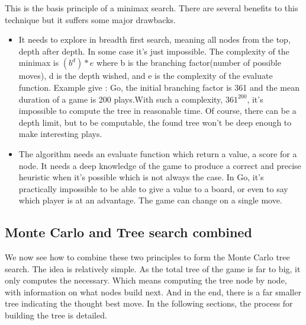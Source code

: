 	
 This is the basis principle of a minimax search. There are several benefits to this technique but it suffers some major drawbacks. 
 
 \begin{itemize}
 \item It needs to explore in breadth first search, meaning all nodes from the top, depth after depth. In some case it's just impossible. The complexity of the minimax is $(b^d)*e$ where b is the branching factor(number of possible moves), d is the depth wished, and e is the complexity of the evaluate function. Example give : Go, the initial branching factor is 361 and the mean duration of a game is 200 plays.With such a complexity, $361^200$, it's impossible to compute the tree in reasonable time. Of course, there can be a depth limit, but to be computable, the found tree won't be deep enough to make interesting plays. 
 \item The algorithm needs an evaluate function which return a value, a score for a node. It needs a deep knowledge of the game to produce a correct and precise heuristic when it's possible which is not always the case. In Go, it's practically impossible to be able to give a value to a board, or even to say which player is at an advantage. The game can change on a single move. 
 \end{itemize}

\subsection{Monte Carlo and Tree search combined}

We now see how to combine these two principles to form the Monte Carlo tree search. The idea is relatively simple. As the total tree of the game is far to big, it only computes the necessary. Which means computing the tree node by node, with information on what nodes build next. And in the end, there is a far smaller tree indicating the thought best move. In the following sections, the process for building the tree is detailed. 

